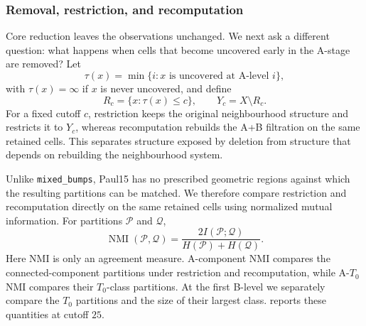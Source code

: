 \documentclass[a4paper,11pt]{article}
\theoremstyle{definition}
\theoremstyle{remark}
\begin{document}
\subsubsection*{Removal, restriction, and recomputation}
\label{subsec:paul15-rerun}

Core reduction leaves the observations unchanged. We next ask a different question: what happens when cells that become uncovered early in the A-stage are removed? Let
$$
\tau(x)=\min\{i\colon x\text{ is uncovered at A-level }i\},
$$
with $\tau(x)=\infty$ if $x$ is never uncovered, and define
$$
R_c=\{x\colon\tau(x)\leq c\},
\qquad
Y_c=X\setminus R_c.
$$
For a fixed cutoff $c$, restriction keeps the original neighbourhood structure and restricts it to $Y_c$, whereas recomputation rebuilds the A+B filtration on the same retained cells. This separates structure exposed by deletion from structure that depends on rebuilding the neighbourhood system.

Unlike \texttt{mixed\_bumps}, Paul15 has no prescribed geometric regions against which the resulting partitions can be matched. We therefore compare restriction and recomputation directly on the same retained cells using normalized mutual information. For partitions $\mathcal P$ and $\mathcal Q$,
$$
\operatorname{NMI}(\mathcal P,\mathcal Q)
=
\frac{2I(\mathcal P;\mathcal Q)}
{H(\mathcal P)+H(\mathcal Q)}.
$$
Here NMI is only an agreement measure. A-component NMI compares the connected-component partitions under restriction and recomputation, while A-$T_0$ NMI compares their $T_0$-class partitions. At the first B-level we separately compare the $T_0$ partitions and the size of their largest class.  reports these quantities at cutoff $25$.
\end{document}
